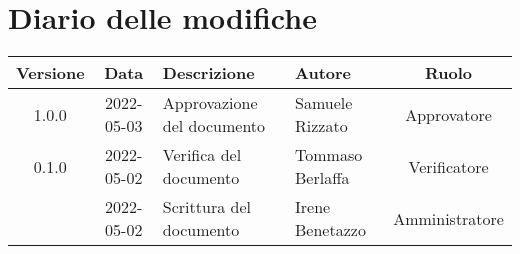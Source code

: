 \section*{Diario delle modifiche}
	\begin{center}
	\renewcommand{\arraystretch}{1.8} %
	\begin{tabular}{ |c|c|m{12em}|m{7em}|c| }
	\hline
	\textbf{Versione} & \textbf{Data} & \textbf{Descrizione} &  \textbf{Autore} &  \textbf{Ruolo} \\ %
	\hline
	1.0.0 & 2022-05-03 & Approvazione del \newline documento & Samuele \newline Rizzato & Approvatore\\
	\hline
	0.1.0 & 2022-05-02 & Verifica del documento & Tommaso Berlaffa & Verificatore\\
	\hline
    & 2022-05-02 & Scrittura del documento & Irene Benetazzo & Amministratore\\ 
	\hline
	\end{tabular}
	\end{center}
	\newpage